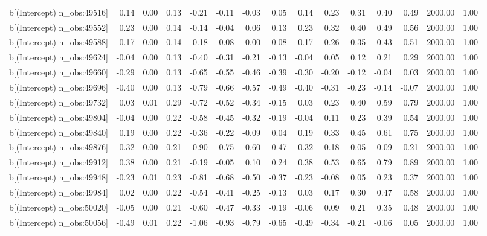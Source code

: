 \begin{table}[ht]
\begin{tabular}{rrrrrrrrrrrrrrr}
  b[(Intercept) n\_obs:49516] & 0.14 & 0.00 & 0.13 & -0.21 & -0.11 & -0.03 & 0.05 & 0.14 & 0.23 & 0.31 & 0.40 & 0.49 & 2000.00 & 1.00 \\ 
  b[(Intercept) n\_obs:49552] & 0.23 & 0.00 & 0.14 & -0.14 & -0.04 & 0.06 & 0.13 & 0.23 & 0.32 & 0.40 & 0.49 & 0.56 & 2000.00 & 1.00 \\ 
  b[(Intercept) n\_obs:49588] & 0.17 & 0.00 & 0.14 & -0.18 & -0.08 & -0.00 & 0.08 & 0.17 & 0.26 & 0.35 & 0.43 & 0.51 & 2000.00 & 1.00 \\ 
  b[(Intercept) n\_obs:49624] & -0.04 & 0.00 & 0.13 & -0.40 & -0.31 & -0.21 & -0.13 & -0.04 & 0.05 & 0.12 & 0.21 & 0.29 & 2000.00 & 1.00 \\ 
  b[(Intercept) n\_obs:49660] & -0.29 & 0.00 & 0.13 & -0.65 & -0.55 & -0.46 & -0.39 & -0.30 & -0.20 & -0.12 & -0.04 & 0.03 & 2000.00 & 1.00 \\ 
  b[(Intercept) n\_obs:49696] & -0.40 & 0.00 & 0.13 & -0.79 & -0.66 & -0.57 & -0.49 & -0.40 & -0.31 & -0.23 & -0.14 & -0.07 & 2000.00 & 1.00 \\ 
  b[(Intercept) n\_obs:49732] & 0.03 & 0.01 & 0.29 & -0.72 & -0.52 & -0.34 & -0.15 & 0.03 & 0.23 & 0.40 & 0.59 & 0.79 & 2000.00 & 1.00 \\ 
  b[(Intercept) n\_obs:49804] & -0.04 & 0.00 & 0.22 & -0.58 & -0.45 & -0.32 & -0.19 & -0.04 & 0.11 & 0.23 & 0.39 & 0.54 & 2000.00 & 1.00 \\ 
  b[(Intercept) n\_obs:49840] & 0.19 & 0.00 & 0.22 & -0.36 & -0.22 & -0.09 & 0.04 & 0.19 & 0.33 & 0.45 & 0.61 & 0.75 & 2000.00 & 1.00 \\ 
  b[(Intercept) n\_obs:49876] & -0.32 & 0.00 & 0.21 & -0.90 & -0.75 & -0.60 & -0.47 & -0.32 & -0.18 & -0.05 & 0.09 & 0.21 & 2000.00 & 1.00 \\ 
  b[(Intercept) n\_obs:49912] & 0.38 & 0.00 & 0.21 & -0.19 & -0.05 & 0.10 & 0.24 & 0.38 & 0.53 & 0.65 & 0.79 & 0.89 & 2000.00 & 1.00 \\ 
  b[(Intercept) n\_obs:49948] & -0.23 & 0.01 & 0.23 & -0.81 & -0.68 & -0.50 & -0.37 & -0.23 & -0.08 & 0.05 & 0.23 & 0.37 & 2000.00 & 1.00 \\ 
  b[(Intercept) n\_obs:49984] & 0.02 & 0.00 & 0.22 & -0.54 & -0.41 & -0.25 & -0.13 & 0.03 & 0.17 & 0.30 & 0.47 & 0.58 & 2000.00 & 1.00 \\ 
  b[(Intercept) n\_obs:50020] & -0.05 & 0.00 & 0.21 & -0.60 & -0.47 & -0.33 & -0.19 & -0.06 & 0.09 & 0.21 & 0.35 & 0.48 & 2000.00 & 1.00 \\ 
  b[(Intercept) n\_obs:50056] & -0.49 & 0.01 & 0.22 & -1.06 & -0.93 & -0.79 & -0.65 & -0.49 & -0.34 & -0.21 & -0.06 & 0.05 & 2000.00 & 1.00 \\ 

\end{tabular}
\end{table}
